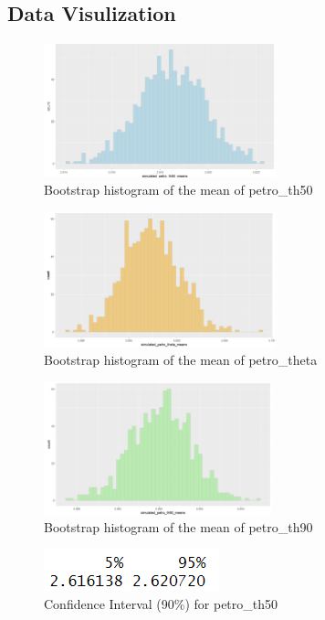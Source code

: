 \documentclass[12pt]{article}
\begin{document}
\subsection{Data Visulization}

\begin{figure}[h]
	\centering
	\includegraphics[width=0.6\textwidth]{pic/50_h.png}
	\caption{Bootstrap histogram of the mean of petro\_th50}
\end{figure}

\begin{figure}[h]
	\centering
	\includegraphics[width=0.6\textwidth]{pic/the_h.png}
	\caption{Bootstrap histogram of the mean of petro\_theta}
\end{figure}

\begin{figure}[!h]
	\centering
	\includegraphics[width=0.59\textwidth]{pic/90_h.png}
	\caption{Bootstrap histogram of the mean of petro\_th90}
\end{figure}


\begin{figure}[h]
	\centering
	\includegraphics{pic/50_t.png}
	\caption{Confidence Interval (90\%) for petro\_th50}
\end{figure}
\end{document}
